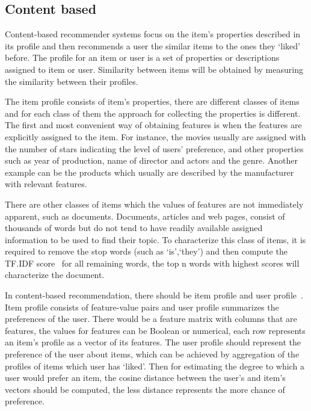 \subsection{Content based}
Content-based recommender systems focus on the item's properties described in its profile and then recommends a user the similar items to the ones they `liked' before. The profile for an item or user is a set of properties or descriptions assigned to item or user. Similarity between items will be obtained by measuring the similarity between their profiles. 


The item profile consists of item's properties, there are different classes of items and for each class of them the approach for collecting the properties is different. The first and most convenient way of obtaining features is when the features are explicitly assigned to the item. For instance, the movies usually are assigned with the number of stars indicating the level of users' preference, and other properties such as year of production, name of director and actors and the genre. Another example can be the products which usually are described by the manufacturer with relevant features. 

There are other classes of items which the values of features are not immediately apparent, such as documents. Documents, articles and web pages, consist of thousands of words but do not tend to have readily available assigned information to be used to find their topic. To characterize this class of items, it is required to remove the stop words (such as `is',`they') and then compute the TF.IDF score~\cite{ramos2003using} for all remaining words, the top n words with highest scores will characterize the document.


In content-based recommendation, there should be item profile and user profile~\cite{rajaraman2011mining}. Item proﬁle consists of feature-value pairs and user proﬁle summarizes the preferences of the user. There would be a feature matrix with columns that are features, the values for features can be Boolean or numerical, each row represents an item's profile as a vector of its features. The user profile should represent the preference of the user about items, which can be achieved by aggregation of the proﬁles of items which user has `liked'. Then for estimating the degree to which a user would prefer an item, the cosine distance between the user’s and item’s vectors should be computed, the less distance represents the more chance of preference.




